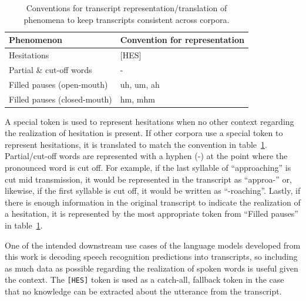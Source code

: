 \documentclass[12pt]{article}
\begin{document}
\begin{table}[h!]
    \centering
    \begin{tabular}{l l}
        \toprule
        Phenomenon                   & Convention for representation \\
        \midrule
        Hesitations                  & [HES]                         \\
        \midrule
        Partial \& cut-off words     & -                             \\
        \midrule
        Filled pauses (open-mouth)   & uh, um, ah                    \\
        \midrule
        Filled pauses (closed-mouth) & hm, mhm                       \\
        \bottomrule
    \end{tabular}
    \caption{Conventions for transcript representation/translation of phenomena to keep transcripts consistent across corpora.}
    \label{tab:phenomena_conventions}
\end{table}

A special token is used to represent hesitations when no other context regarding the realization of hesitation is present. If other corpora use a
special token to represent hesitations, it is translated to match the convention in table~\ref{tab:phenomena_conventions}. Partial/cut-off words
are represented with a hyphen (-) at the point where the pronounced word is cut off. For example, if the last syllable of ``approaching'' is cut
mid transmission, it would be represented in the transcript as ``approa-'' or, likewise, if the first syllable is cut off, it would be written as
``-roaching''. Lastly, if there is enough information in the original transcript to indicate the realization of a hesitation, it is represented by
the most appropriate token from ``Filled pauses'' in table~\ref{tab:phenomena_conventions}.

One of the intended downstream use cases of the language models developed from this work is decoding speech recognition predictions into transcripts,
so including as much data as possible regarding the realization of spoken words is useful given the context. The \lstinline|[HES]| token is used as a
catch-all, fallback token in the case that no knowledge can be extracted about the utterance from the transcript.
\end{document}
